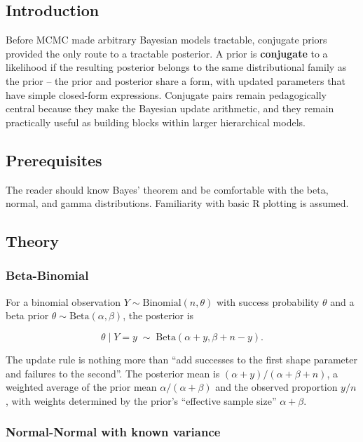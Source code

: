 \documentclass[
]{article}
\author{}
\date{\vspace{-2.5em}}
\begin{document}
\subsection{Introduction}\label{introduction}

Before MCMC made arbitrary Bayesian models tractable, conjugate priors
provided the only route to a tractable posterior. A prior is
\textbf{conjugate} to a likelihood if the resulting posterior belongs to
the same distributional family as the prior -- the prior and posterior
share a form, with updated parameters that have simple closed-form
expressions. Conjugate pairs remain pedagogically central because they
make the Bayesian update arithmetic, and they remain practically useful
as building blocks within larger hierarchical models.

\subsection{Prerequisites}\label{prerequisites}

The reader should know Bayes' theorem and be comfortable with the beta,
normal, and gamma distributions. Familiarity with basic R plotting is
assumed.

\subsection{Theory}\label{theory}

\subsubsection{Beta-Binomial}\label{beta-binomial}

For a binomial observation \(Y \sim \text{Binomial}(n, \theta)\) with
success probability \(\theta\) and a beta prior
\(\theta \sim \text{Beta}(\alpha, \beta)\), the posterior is

\[\theta \mid Y = y \;\sim\; \text{Beta}(\alpha + y, \beta + n - y).\]

The update rule is nothing more than ``add successes to the first shape
parameter and failures to the second''. The posterior mean is
\((\alpha + y)/(\alpha + \beta + n)\), a weighted average of the prior
mean \(\alpha/(\alpha + \beta)\) and the observed proportion \(y/n\),
with weights determined by the prior's ``effective sample size''
\(\alpha + \beta\).

\subsubsection{Normal-Normal with known
variance}\label{normal-normal-with-known-variance}
\end{document}
